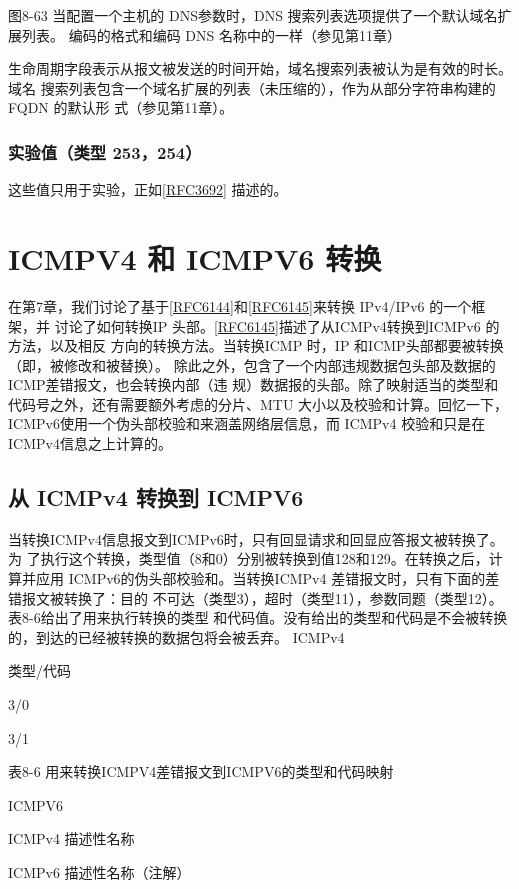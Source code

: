 图8-63 当配置一个主机的 DNS参数时，DNS 搜索列表选项提供了一个默认域名扩展列表。
编码的格式和编码 DNS 名称中的一样（参见第11章）

生命周期字段表示从报文被发送的时间开始，域名搜索列表被认为是有效的时长。域名
搜索列表包含一个域名扩展的列表（未压缩的），作为从部分字符串构建的FQDN 的默认形
式（参见第11章）。

\subsubsection{实验值（类型 253，254）}
这些值只用于实验，正如\href{https://www.rfc-editor.org/rfc/rfc3692}{[RFC3692]} 描述的。

\section{ICMPV4 和 ICMPV6 转换}
在第7章，我们讨论了基于\href{https://www.rfc-editor.org/rfc/rfc6144}{[RFC6144]}和\href{https://www.rfc-editor.org/rfc/rfc6145}{[RFC6145]}来转换 IPv4/IPv6 的一个框架，并
讨论了如何转换IP 头部。\href{https://www.rfc-editor.org/rfc/rfc6145}{[RFC6145]}描述了从ICMPv4转换到ICMPv6 的方法，以及相反
方向的转换方法。当转换ICMP 时，IP 和ICMP头部都要被转换（即，被修改和被替换）。
除此之外，包含了一个内部违规数据包头部及数据的ICMP差错报文，也会转换内部（违
规）数据报的头部。除了映射适当的类型和代码号之外，还有需要额外考虑的分片、MTU
大小以及校验和计算。回忆一下，ICMPv6使用一个伪头部校验和来涵盖网络层信息，而
ICMPv4 校验和只是在ICMPv4信息之上计算的。

\subsection{从 ICMPv4 转换到 ICMPV6}
当转换ICMPv4信息报文到ICMPv6时，只有回显请求和回显应答报文被转换了。为
了执行这个转换，类型值（8和0）分别被转换到值128和129。在转换之后，计算并应用
ICMPv6的伪头部校验和。当转换ICMPv4 差错报文时，只有下面的差错报文被转换了：目的
不可达（类型3），超时（类型11），参数同题（类型12）。表8-6给出了用来执行转换的类型
和代码值。没有给出的类型和代码是不会被转换的，到达的已经被转换的数据包将会被丢弃。
ICMPv4

类型/代码

3/0

3/1

表8-6 用来转换ICMPV4差错报文到ICMPV6的类型和代码映射

ICMPV6

ICMPv4 描述性名称

ICMPv6 描述性名称（注解）

